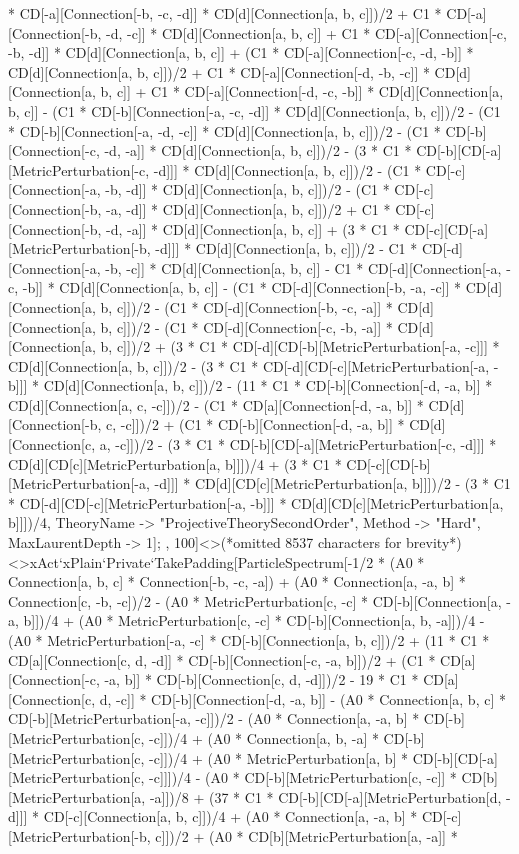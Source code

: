* CD[-a][Connection[-b, -c, -d]] * CD[d][Connection[a, b, c]])/2 + C1 * CD[-a][Connection[-b, -d, -c]] * CD[d][Connection[a, b, c]] + C1 * CD[-a][Connection[-c, -b, -d]] * CD[d][Connection[a, b, c]] + (C1 * CD[-a][Connection[-c, -d, -b]] * CD[d][Connection[a, b, c]])/2 + C1 * CD[-a][Connection[-d, -b, -c]] * CD[d][Connection[a, b, c]] + C1 * CD[-a][Connection[-d, -c, -b]] * CD[d][Connection[a, b, c]] - (C1 * CD[-b][Connection[-a, -c, -d]] * CD[d][Connection[a, b, c]])/2 - (C1 * CD[-b][Connection[-a, -d, -c]] * CD[d][Connection[a, b, c]])/2 - (C1 * CD[-b][Connection[-c, -d, -a]] * CD[d][Connection[a, b, c]])/2 - (3 * C1 * CD[-b][CD[-a][MetricPerturbation[-c, -d]]] * CD[d][Connection[a, b, c]])/2 - (C1 * CD[-c][Connection[-a, -b, -d]] * CD[d][Connection[a, b, c]])/2 - (C1 * CD[-c][Connection[-b, -a, -d]] * CD[d][Connection[a, b, c]])/2 + C1 * CD[-c][Connection[-b, -d, -a]] * CD[d][Connection[a, b, c]] + (3 * C1 * CD[-c][CD[-a][MetricPerturbation[-b, -d]]] * CD[d][Connection[a, b, c]])/2 - C1 * CD[-d][Connection[-a, -b, -c]] * CD[d][Connection[a, b, c]] - C1 * CD[-d][Connection[-a, -c, -b]] * CD[d][Connection[a, b, c]] - (C1 * CD[-d][Connection[-b, -a, -c]] * CD[d][Connection[a, b, c]])/2 - (C1 * CD[-d][Connection[-b, -c, -a]] * CD[d][Connection[a, b, c]])/2 - (C1 * CD[-d][Connection[-c, -b, -a]] * CD[d][Connection[a, b, c]])/2 + (3 * C1 * CD[-d][CD[-b][MetricPerturbation[-a, -c]]] * CD[d][Connection[a, b, c]])/2 - (3 * C1 * CD[-d][CD[-c][MetricPerturbation[-a, -b]]] * CD[d][Connection[a, b, c]])/2 - (11 * C1 * CD[-b][Connection[-d, -a, b]] * CD[d][Connection[a, c, -c]])/2 - (C1 * CD[a][Connection[-d, -a, b]] * CD[d][Connection[-b, c, -c]])/2 + (C1 * CD[-b][Connection[-d, -a, b]] * CD[d][Connection[c, a, -c]])/2 - (3 * C1 * CD[-b][CD[-a][MetricPerturbation[-c, -d]]] * CD[d][CD[c][MetricPerturbation[a, b]]])/4 + (3 * C1 * CD[-c][CD[-b][MetricPerturbation[-a, -d]]] * CD[d][CD[c][MetricPerturbation[a, b]]])/2 - (3 * C1 * CD[-d][CD[-c][MetricPerturbation[-a, -b]]] * CD[d][CD[c][MetricPerturbation[a, b]]])/4, TheoryName -> "ProjectiveTheorySecondOrder", Method -> "Hard", MaxLaurentDepth -> 1]; , 100]<>(*omitted 8537 characters for brevity*)<>xAct`xPlain`Private`TakePadding[ParticleSpectrum[-1/2 * (A0 * Connection[a, b, c] * Connection[-b, -c, -a]) + (A0 * Connection[a, -a, b] * Connection[c, -b, -c])/2 - (A0 * MetricPerturbation[c, -c] * CD[-b][Connection[a, -a, b]])/4 + (A0 * MetricPerturbation[c, -c] * CD[-b][Connection[a, b, -a]])/4 - (A0 * MetricPerturbation[-a, -c] * CD[-b][Connection[a, b, c]])/2 + (11 * C1 * CD[a][Connection[c, d, -d]] * CD[-b][Connection[-c, -a, b]])/2 + (C1 * CD[a][Connection[-c, -a, b]] * CD[-b][Connection[c, d, -d]])/2 - 19 * C1 * CD[a][Connection[c, d, -c]] * CD[-b][Connection[-d, -a, b]] - (A0 * Connection[a, b, c] * CD[-b][MetricPerturbation[-a, -c]])/2 - (A0 * Connection[a, -a, b] * CD[-b][MetricPerturbation[c, -c]])/4 + (A0 * Connection[a, b, -a] * CD[-b][MetricPerturbation[c, -c]])/4 + (A0 * MetricPerturbation[a, b] * CD[-b][CD[-a][MetricPerturbation[c, -c]]])/4 - (A0 * CD[-b][MetricPerturbation[c, -c]] * CD[b][MetricPerturbation[a, -a]])/8 + (37 * C1 * CD[-b][CD[-a][MetricPerturbation[d, -d]]] * CD[-c][Connection[a, b, c]])/4 + (A0 * Connection[a, -a, b] * CD[-c][MetricPerturbation[-b, c]])/2 + (A0 * CD[b][MetricPerturbation[a, -a]] * 